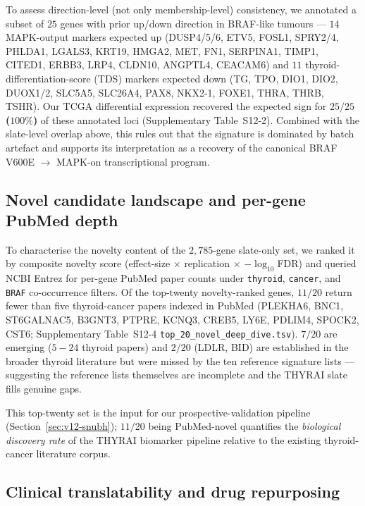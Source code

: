 To assess direction-level (not only membership-level) consistency, we annotated a subset
of $25$ genes with prior up/down direction in BRAF-like tumours --- $14$ MAPK-output
markers expected up (DUSP4/5/6, ETV5, FOSL1, SPRY2/4, PHLDA1, LGALS3, KRT19, HMGA2, MET,
FN1, SERPINA1, TIMP1, CITED1, ERBB3, LRP4, CLDN10, ANGPTL4, CEACAM6) and $11$
thyroid-differentiation-score (TDS) markers expected down (TG, TPO, DIO1, DIO2, DUOX1/2,
SLC5A5, SLC26A4, PAX8, NKX2-1, FOXE1, THRA, THRB, TSHR). Our TCGA differential expression
recovered the expected sign for \textbf{$25/25$ ($100\%$)} of these annotated loci
(Supplementary Table~S12-2). Combined with the slate-level overlap above, this rules out
that the signature is dominated by batch artefact and supports its interpretation as a
recovery of the canonical BRAF V600E $\to$ MAPK-on transcriptional program.

\subsection{Novel candidate landscape and per-gene PubMed depth}
\label{sec:v12-novel}

To characterise the novelty content of the $2{,}785$-gene slate-only set, we ranked it
by composite novelty score (effect-size $\times$ replication $\times$ $-\log_{10}$FDR)
and queried NCBI Entrez for per-gene PubMed paper counts under \texttt{thyroid},
\texttt{cancer}, and \texttt{BRAF} co-occurrence filters. Of the top-twenty
novelty-ranked genes, \textbf{$11/20$} return fewer than five thyroid-cancer papers
indexed in PubMed (PLEKHA6, BNC1, ST6GALNAC5, B3GNT3, PTPRE, KCNQ3, CREB5, LY6E, PDLIM4,
SPOCK2, CST6; Supplementary Table~S12-4 \texttt{top\_20\_novel\_deep\_dive.tsv}).
$7/20$ are emerging ($5{-}24$ thyroid papers) and $2/20$ (LDLR, BID) are established
in the broader thyroid literature but were missed by the ten reference signature lists
--- suggesting the reference lists themselves are incomplete and the THYRAI slate fills
genuine gaps.

This top-twenty set is the input for our prospective-validation pipeline
(Section~\ref{sec:v12-snubh}); $11/20$ being PubMed-novel quantifies the
\emph{biological discovery rate} of the THYRAI biomarker pipeline relative to the
existing thyroid-cancer literature corpus.

\subsection{Clinical translatability and drug repurposing}
\label{sec:v12-translatability}

